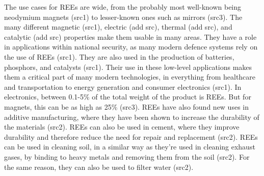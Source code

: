 The use cases for REEs are wide, from the probably most well-known being neodymium magnets (src1) to lesser-known ones such as mirrors (src3). The many different magnetic (src1), electric (add src), thermal (add src), and catalytic (add src) properties make them usable in many areas. They have a role in applications within national security, as many modern defence systems rely on the use of REEs (src1). They are also used in the production of batteries, phosphors, and catalysts (src1). Their use in these low-level applications makes them a critical part of many modern technologies, in everything from healthcare and transportation to energy generation and consumer electronics (src1). In electronics, between 0.1-5\% of the total weight of the product is REEs. But for magnets, this can be as high as 25\% (src3). REEs have also found new uses in additive manufacturing, where they have been shown to increase the durability of the materials (src2). REEs can also be used in cement, where they improve durability and therefore reduce the need for repair and replacement (src2). REEs can be used in cleaning soil, in a similar way as they're used in cleaning exhaust gases, by binding to heavy metals and removing them from the soil (src2). For the same reason, they can also be used to filter water (src2).